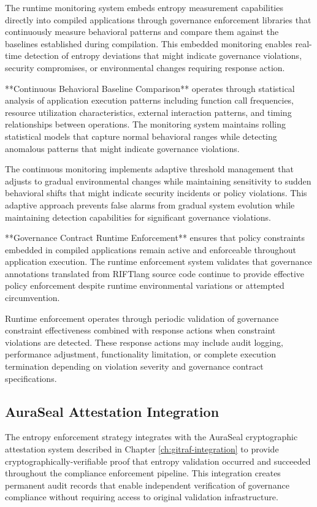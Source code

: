 The runtime monitoring system embeds entropy measurement capabilities directly into compiled applications through governance enforcement libraries that continuously measure behavioral patterns and compare them against the baselines established during compilation. This embedded monitoring enables real-time detection of entropy deviations that might indicate governance violations, security compromises, or environmental changes requiring response action.

**Continuous Behavioral Baseline Comparison** operates through statistical analysis of application execution patterns including function call frequencies, resource utilization characteristics, external interaction patterns, and timing relationships between operations. The monitoring system maintains rolling statistical models that capture normal behavioral ranges while detecting anomalous patterns that might indicate governance violations.

The continuous monitoring implements adaptive threshold management that adjusts to gradual environmental changes while maintaining sensitivity to sudden behavioral shifts that might indicate security incidents or policy violations. This adaptive approach prevents false alarms from gradual system evolution while maintaining detection capabilities for significant governance violations.

**Governance Contract Runtime Enforcement** ensures that policy constraints embedded in compiled applications remain active and enforceable throughout application execution. The runtime enforcement system validates that governance annotations translated from RIFTlang source code continue to provide effective policy enforcement despite runtime environmental variations or attempted circumvention.

Runtime enforcement operates through periodic validation of governance constraint effectiveness combined with response actions when constraint violations are detected. These response actions may include audit logging, performance adjustment, functionality limitation, or complete execution termination depending on violation severity and governance contract specifications.

\subsection{AuraSeal Attestation Integration}

The entropy enforcement strategy integrates with the AuraSeal cryptographic attestation system described in Chapter \ref{ch:gitraf-integration} to provide cryptographically-verifiable proof that entropy validation occurred and succeeded throughout the compliance enforcement pipeline. This integration creates permanent audit records that enable independent verification of governance compliance without requiring access to original validation infrastructure.

